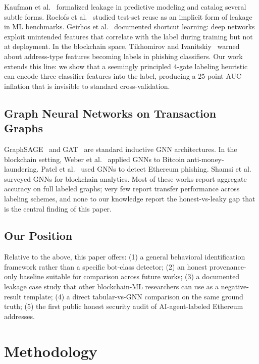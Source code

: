 \documentclass[sigconf,nonacm=false]{acmart}
\begin{document}
Kaufman et al.~\cite{kaufman2012leakage} formalized leakage in predictive modeling and catalog several subtle forms. Roelofs et al.~\cite{roelofs2019metadata} studied test-set reuse as an implicit form of leakage in ML benchmarks. Geirhos et al.~\cite{geirhos2020shortcut} documented shortcut learning: deep networks exploit unintended features that correlate with the label during training but not at deployment. In the blockchain space, Tikhomirov and Ivanitskiy~\cite{tikhomirov2021phishing} warned about address-type features becoming labels in phishing classifiers. Our work extends this line: we show that a seemingly principled 4-gate labeling heuristic can encode three classifier features into the label, producing a 25-point AUC inflation that is invisible to standard cross-validation.

\subsection{Graph Neural Networks on Transaction Graphs}

GraphSAGE~\cite{hamilton2017graphsage} and GAT~\cite{velickovic2018gat} are standard inductive GNN architectures. In the blockchain setting, Weber et al.~\cite{weber2019antimoney} applied GNNs to Bitcoin anti-money-laundering. Patel et al.~\cite{patel2021phishing} used GNNs to detect Ethereum phishing. Shamsi et al.~\cite{shamsi2023gnnsurvey} surveyed GNNs for blockchain analytics. Most of these works report aggregate accuracy on full labeled graphs; very few report transfer performance across labeling schemes, and none to our knowledge report the honest-vs-leaky gap that is the central finding of this paper.

\subsection{Our Position}

Relative to the above, this paper offers: (1) a general behavioral identification framework rather than a specific bot-class detector; (2) an honest provenance-only baseline suitable for comparison across future works; (3) a documented leakage case study that other blockchain-ML researchers can use as a negative-result template; (4) a direct tabular-vs-GNN comparison on the same ground truth; (5) the first public honest security audit of AI-agent-labeled Ethereum addresses.


\section{Methodology}
\end{document}
